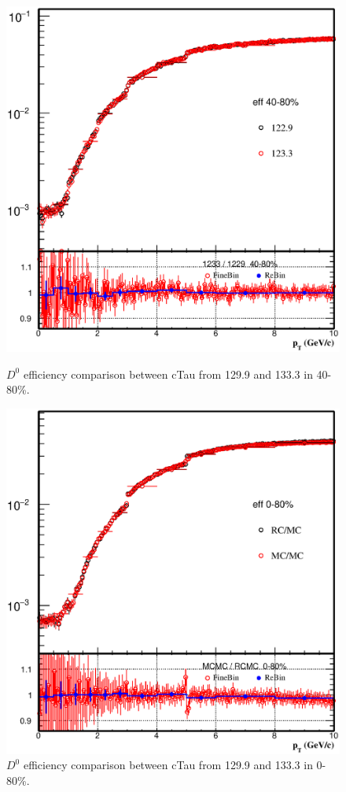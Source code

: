 \begin{figure}[htbp]
\begin{minipage}[htbp]{0.52\linewidth}
\centering
\includegraphics[width=1.0\textwidth]{figure/Run14_D0HFT/D0_eff_1233_40_80.eps}
\caption{$D^{0}$ efficiency comparison between cTau from 129.9 and 133.3 in 40-80\%. \label{fig:D0_eff_1233_40_80}}
\end{minipage}
\hfill
\begin{minipage}[htbp]{0.52\linewidth}
\centering
\includegraphics[width=1.0\textwidth]{figure/Run14_D0HFT/D0_eff_forMCRC_0_80.eps} 
\caption{$D^{0}$ efficiency comparison between cTau from 129.9 and 133.3 in 0-80\%. \label{fig:D0_eff_1233_0_80}}
\end{minipage}
\end{figure}
